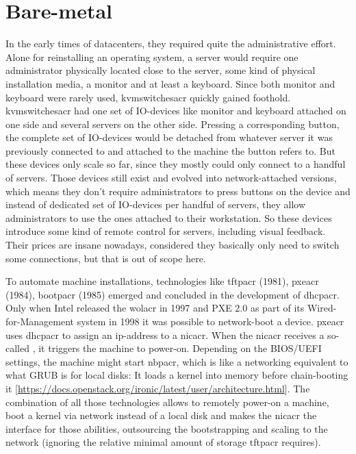 \section{Bare-metal}
In the early times of datacenters, they required quite the administrative effort. Alone for reinstalling an operating system, a server would require one administrator physically located close to the server, some kind of physical installation media, a monitor and at least a keyboard. Since both monitor and keyboard were rarely used, \gls{kvmswitchesacr} quickly gained foothold. \Gls{kvmswitchesacr} had one set of IO-devices like monitor and keyboard attached on one side and several servers on the other side. Pressing a corresponding button, the complete set of IO-devices would be  detached from whatever server it was previously connected to and attached to the machine the button refers to.
But these devices only scale so far, since they mostly could only connect to a handful of servers.
Those devices still exist and evolved into network-attached versions, which means they don't require administrators to press buttons on the device and instead of dedicated set of IO-devices per handful of servers, they allow administrators to use the ones attached to their workstation. So these devices introduce some kind of remote control for servers, including visual feedback.
Their prices are insane nowadays, considered they basically only need to switch some connections, but that is out of scope here.

To automate machine installations, technologies like \gls{tftpacr} (1981), \gls{pxeacr} (1984), \gls{bootpacr} (1985) emerged and concluded in the development of \gls{dhcpacr}. Only when Intel released the \gls{wolacr} in 1997 and PXE 2.0 as part of its Wired-for-Management system in 1998 it was possible to network-boot a device.
\Gls{pxeacr} uses \gls{dhcpacr} to assign an ip-address to a \gls{nicacr}. When the \gls{nicacr} receives a so-called , it triggers the machine to power-on. Depending on the BIOS/UEFI settings, the machine might start \gls{nbpacr}, which is like a networking equivalent to what GRUB is for local disks: It loads a kernel into memory before chain-booting it [\url{https://docs.openstack.org/ironic/latest/user/architecture.html}].
The combination of all those technologies allows to remotely power-on a machine, boot a kernel via network instead of a local disk and makes the \gls{nicacr} the interface for those abilities, outsourcing the bootstrapping and scaling to the network (ignoring the relative minimal amount of storage \gls{tftpacr} requires).

